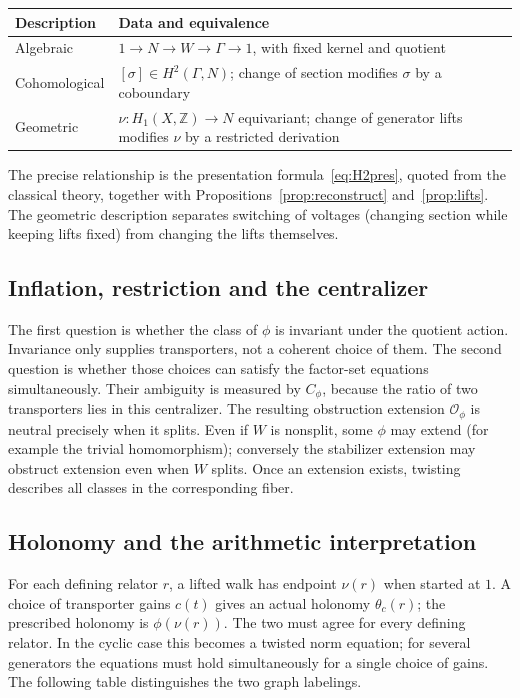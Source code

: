 \documentclass[12pt,letterpaper]{article}
\numberwithin{equation}{section}
\theoremstyle{plain}
\theoremstyle{definition}
\newcommand{\Z}{\mathbb{Z}}
\begin{document}
\begin{center}
\begin{tabular}{@{}p{}p{}@{}}
\toprule
Description & Data and equivalence \\
\midrule
Algebraic & $1\to N\to W\to\Gamma\to1$, with fixed kernel and quotient \\
Cohomological & $[\sigma]\in H^2(\Gamma,N)$; change of section modifies $\sigma$ by a coboundary \\
Geometric & $\nu:H_1(X,\Z)\to N$ equivariant; change of generator lifts modifies $\nu$ by a restricted derivation \\
\bottomrule
\end{tabular}
\end{center}
The precise relationship is the presentation formula~\eqref{eq:H2pres}, quoted from the classical theory, together with Propositions~\ref{prop:reconstruct} and~\ref{prop:lifts}. The geometric description separates switching of voltages (changing section while keeping lifts fixed) from changing the lifts themselves.

\subsection{Inflation, restriction and the centralizer}

The first question is whether the class of $\phi$ is invariant under the quotient action. Invariance only supplies transporters, not a coherent choice of them. The second question is whether those choices can satisfy the factor-set equations simultaneously. Their ambiguity is measured by $C_\phi$, because the ratio of two transporters lies in this centralizer. The resulting obstruction extension $\mathcal O_\phi$ is neutral precisely when it splits. Even if $W$ is nonsplit, some $\phi$ may extend (for example the trivial homomorphism); conversely the stabilizer extension may obstruct extension even when $W$ splits. Once an extension exists, twisting describes all classes in the corresponding fiber.

\subsection{Holonomy and the arithmetic interpretation}

For each defining relator $r$, a lifted walk has endpoint $\nu(r)$ when started at $1$. A choice of transporter gains $c(t)$ gives an actual holonomy $\theta_c(r)$; the prescribed holonomy is $\phi(\nu(r))$. The two must agree for every defining relator. In the cyclic case this becomes a twisted norm equation; for several generators the equations must hold simultaneously for a single choice of gains. The following table distinguishes the two graph labelings.
\end{document}
